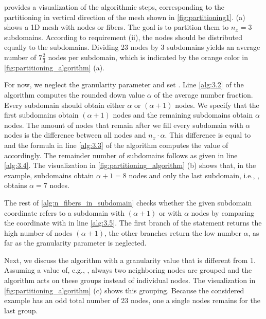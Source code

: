  provides a visualization of the algorithmic steps, corresponding to the partitioning in vertical direction of the mesh shown in \cref{fig:partitioning1}.  (a) shows a 1D mesh with  nodes or fibers.
The goal is to partition them to $n_x=3$ subdomains. According to requirement (ii), the nodes should be distributed equally to the subdomains. Dividing 23 nodes by 3 subdomains yields an average number of $7\frac23$ nodes per subdomain, which is indicated by the orange color in \cref{fig:partitioning_algorithm} (a). 

For now, we neglect the granularity parameter and set . 
Line \ref{alg:3.2} of the algorithm computes the rounded down value $\alpha$ of the average number fraction. Every subdomain should obtain either $\alpha$ or $(\alpha+1)$ nodes. We specify that the first  subdomains obtain $(\alpha+1)$ nodes and the remaining subdomains obtain $\alpha$ nodes. 
The amount of nodes that remain after we fill every subdomain with $\alpha$ nodes is the difference between all nodes  and  $n_x \cdot \alpha$. This difference is equal to  and the formula in line \ref{alg:3.3} of the algorithm computes the value of  accordingly. The remainder number of subdomains  follows as given in line \ref{alg:3.4}.
The visualization in \cref{fig:partitioning_algorithm} (b) shows that, in the example,  subdomains obtain $\alpha+1=8$ nodes and only the last subdomain, i.e., , obtains $\alpha=7$ nodes.

The rest of \cref{alg:n_fibers_in_subdomain} checks whether the given subdomain coordinate  refers to a subdomain with $(\alpha+1)$ or with $\alpha$ nodes by comparing the coordinate with  in line \ref{alg:3.5}. The first branch of the  statement returns the high number of nodes $(\alpha+1)$, the other branches return the low number $\alpha$, as far as the granularity parameter is neglected.

Next, we discuss the algorithm with a granularity value that is different from 1. 
Assuming a value of, e.g., , always two neighboring nodes are grouped and the algorithm acts on these groups instead of individual nodes. The visualization in \cref{fig:partitioning_algorithm} (c) shows this grouping. Because the considered example has an odd total number of 23 nodes, one a single nodes remains for the last group.

